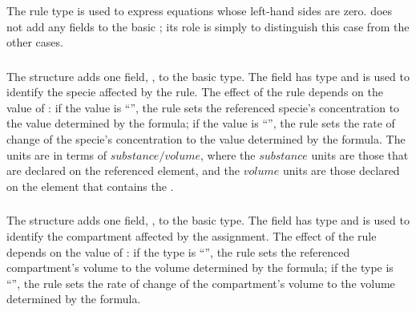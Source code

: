 \documentclass[10pt]{cekarticle}
\begin{document}
The rule type  is used to express equations whose
left-hand sides are zero.   does not add any fields to
the basic ; its role is simply to distinguish this case from
the other cases.


\subsubsection{}

The  structure adds one field,
, to the basic  type.  The field
 has type  and is used to identify the specie
affected by the rule.  The effect of the rule depends on the value of
: if the value is ``'', the rule sets the
referenced specie's concentration to the value determined by the formula;
if the value is ``'', the rule sets the rate of change of the
specie's concentration to the value determined by the formula.  The units
are in terms of $substance/volume$, where the $substance$ units are those
that are declared on the referenced  element, and the
$volume$ units are those declared on the  element that
contains the .


\subsubsection{}

The  structure adds one field, ,
to the basic  type.  The field 
has type  and is used to identify the compartment affected by
the assignment.  The effect of the rule depends on the value of
: if the type is ``'', the rule sets the
referenced compartment's volume to the volume determined by the formula; if
the type is ``'', the rule sets the rate of change of the
compartment's volume to the volume determined by the formula.


\subsubsection{}
\end{document}
